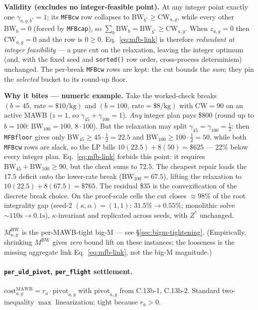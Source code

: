 \documentclass[11pt,a4paper]{article}
\theoremstyle{definition}
\begin{document}
\textbf{Validity (excludes no integer-feasible point).} At any integer point
exactly one $\gamma_{a,g,b^*} = 1$; its \texttt{MFBcw} row collapses to
$\text{BW}_{b^*} \geq \text{CW}_{a,g}$, while every other $\text{BW}_b = 0$
(forced by \texttt{MFBcap}), so $\sum_b \text{BW}_b = \text{BW}_{b^*} \geq
\text{CW}_{a,g}$. When $z_{a,g} = 0$ then $\text{CW}_{a,g} = 0$ and the row is
$0 \geq 0$. Eq.~\ref{eq:mfb-link} is therefore \emph{redundant at integer
feasibility} --- a pure cut on the relaxation, leaving the integer optimum
(and, with the fixed seed and \texttt{sorted()} row order, cross-process
determinism) unchanged. The per-break \texttt{MFBcw} rows are kept: the cut
bounds the \emph{sum}; they pin the \emph{selected} bucket to its round-up floor.

\textbf{Why it bites --- numeric example.} Take the worked-check breaks
$(b=45,\ \text{rate}=\$10/\text{kg})$ and $(b=100,\ \text{rate}=\$8/\text{kg})$
with $\text{CW} = 90$ on an active MAWB ($z=1$, so $\gamma_{45}+\gamma_{100}=1$).
\emph{Any} integer plan pays \$800 (round up to $b=100$: $\text{BW}_{100}=100$,
$8 \cdot 100$). But the relaxation may split $\gamma_{45} = \gamma_{100} =
\tfrac{1}{2}$: then \texttt{MFBfloor} gives only $\text{BW}_{45} \geq 45 \cdot
\tfrac{1}{2} = 22.5$ and $\text{BW}_{100} \geq 100 \cdot \tfrac{1}{2} = 50$,
while both \texttt{MFBcw} rows are slack, so the LP bills $10(22.5) + 8(50) =
\$625$ --- 22\% below every integer plan. Eq.~\ref{eq:mfb-link} forbids this
point: it requires $\text{BW}_{45} + \text{BW}_{100} \geq 90$, but the cheat
sums to $72.5$. The cheapest repair loads the $17.5$ deficit onto the
lower-rate break ($\text{BW}_{100} = 67.5$), lifting the relaxation to
$10(22.5) + 8(67.5) = \$765$. The residual \$35 is the convexification of the
discrete break choice. On the proof-scale cells the cut closes $\approx 98\%$
of the root integrality gap (seed-2 $(\kappa,\alpha)=(1,1)$: $31.5\% \to 0.55\%$;
monolithic solve $\sim\!110\text{s} \to 0.1\text{s}$), $\kappa$-invariant and
replicated across seeds, with $Z^*$ unchanged.

$M^{\text{BW}}_{a,g}$ is the per-MAWB-tight big-M --- see
\S\ref{sec:bigm-tightening}. (Empirically, shrinking $M^{\text{BW}}$ gives
\emph{zero} bound lift on these instances: the looseness is the missing
aggregate link Eq.~\ref{eq:mfb-link}, not the big-M magnitude.)

\paragraph{\texttt{per\_uld\_pivot}, \texttt{per\_flight} settlement.}
$\text{cost}^{\text{MAWB}}_{a,g} = r_a \cdot \text{pivot}_{a,g}$ with
$\text{pivot}_{a,g}$ from C.13b-1, C.13b-2. Standard two-inequality $\max$
linearization; tight because $r_a > 0$.
\end{document}

